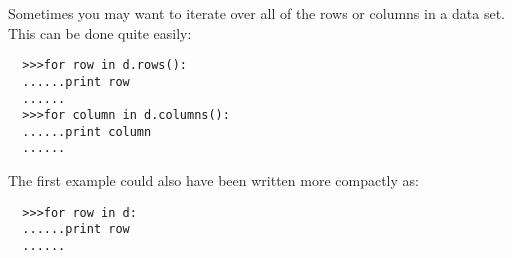 \documentclass[a4paper,11pt]{scrartcl}
\begin{document}
Sometimes you may want to iterate over all of the rows or columns in a data set. This can be done quite easily:
\begin{verbatim}
  >>>for row in d.rows():
  ......print row
  ......
  >>>for column in d.columns():
  ......print column
  ......
\end{verbatim}
The first example could also have been written more compactly as:
\begin{verbatim}
  >>>for row in d:
  ......print row
  ......
\end{verbatim}
\end{document}
